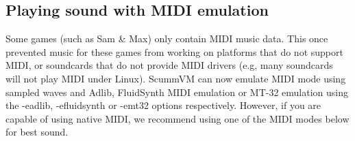 


\subsection{Playing sound with MIDI emulation}

Some games (such as Sam \& Max) only contain MIDI music data.  This once
prevented music for these games from working on platforms that do not support
MIDI, or soundcards that do not provide MIDI drivers (e.g, many soundcards will
not play MIDI under Linux). ScummVM can now emulate MIDI mode using sampled
waves and Adlib, FluidSynth MIDI emulation or MT-32 emulation using the
-eadlib, -efluidsynth or -emt32 options respectively.  However, if you are
capable of using native MIDI, we recommend using one of the MIDI modes below
for best sound.
